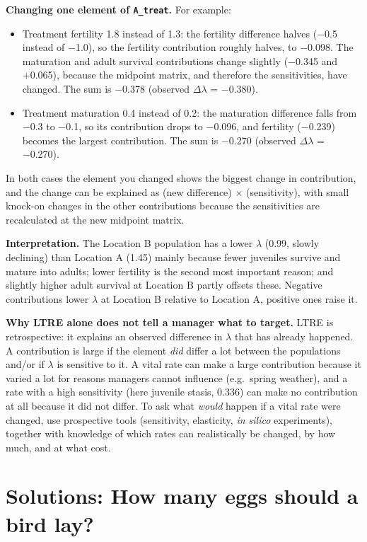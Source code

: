 \documentclass[
  a4paper]{book}
\providecommand{\tightlist}{%
  \setlength{\itemsep}{0pt}\setlength{\parskip}{0pt}}
\begin{document}
\textbf{Changing one element of \texttt{A\_treat}.} For example:

\begin{itemize}
\tightlist
\item
  Treatment fertility 1.8 instead of 1.3: the fertility difference halves (−0.5 instead of −1.0), so the fertility contribution roughly halves, to −0.098. The maturation and adult survival contributions change slightly (−0.345 and +0.065), because the midpoint matrix, and therefore the sensitivities, have changed. The sum is −0.378 (observed \(\Delta\lambda\) = −0.380).
\item
  Treatment maturation 0.4 instead of 0.2: the maturation difference falls from −0.3 to −0.1, so its contribution drops to −0.096, and fertility (−0.239) becomes the largest contribution. The sum is −0.270 (observed \(\Delta\lambda\) = −0.270).
\end{itemize}

In both cases the element you changed shows the biggest change in contribution, and the change can be explained as (new difference) × (sensitivity), with small knock-on changes in the other contributions because the sensitivities are recalculated at the new midpoint matrix.

\textbf{Interpretation.} The Location B population has a lower \(\lambda\) (0.99, slowly declining) than Location A (1.45) mainly because fewer juveniles survive and mature into adults; lower fertility is the second most important reason; and slightly higher adult survival at Location B partly offsets these. Negative contributions lower \(\lambda\) at Location B relative to Location A, positive ones raise it.

\textbf{Why LTRE alone does not tell a manager what to target.} LTRE is retrospective: it explains an observed difference in \(\lambda\) that has already happened. A contribution is large if the element \emph{did} differ a lot between the populations and/or if \(\lambda\) is sensitive to it. A vital rate can make a large contribution because it varied a lot for reasons managers cannot influence (e.g.~spring weather), and a rate with a high sensitivity (here juvenile stasis, 0.336) can make no contribution at all because it did not differ. To ask what \emph{would} happen if a vital rate were changed, use prospective tools (sensitivity, elasticity, \emph{in silico} experiments), together with knowledge of which rates can realistically be changed, by how much, and at what cost.

\section{Solutions: How many eggs should a bird lay?}\label{solutions-how-many-eggs-should-a-bird-lay}
\end{document}
